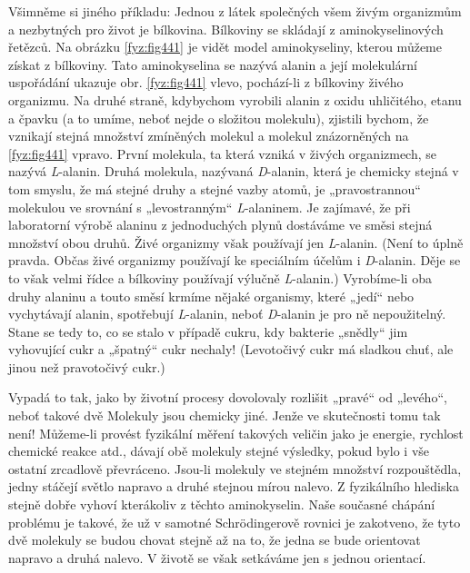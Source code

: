     Všimněme si jiného příkladu: Jednou z látek společných všem živým organizmům a nezbytných pro
    život je bílkovina. Bílkoviny se skládají z aminokyselinových řetězců. Na obrázku
    \ref{fyz:fig441} je vidět model aminokyseliny, kterou můžeme získat z bílkoviny. Tato
    aminokyselina se nazývá alanin a její molekulární uspořádání ukazuje obr. \ref{fyz:fig441}
    vlevo, pochází-li z bílkoviny živého organizmu. Na druhé straně, kdybychom vyrobili alanin z
    oxidu uhličitého, etanu a čpavku (a to umíme, neboť nejde o složitou molekulu), zjistili bychom,
    že vznikají stejná množství zmíněných molekul a molekul znázorněných na \ref{fyz:fig441}
    vpravo. První molekula, ta která vzniká v živých organizmech, se nazývá \emph{L}-alanin. Druhá
    molekula, nazývaná \emph{D}-alanin, která je chemicky stejná v tom smyslu, že má stejné druhy a
    stejné vazby atomů, je „pravostrannou“ molekulou ve srovnání s „levostranným“
    \emph{L}-alaninem. Je zajímavé, že při laboratorní výrobě alaninu z jednoduchých plynů dostáváme
    ve směsi stejná množství obou druhů. Živé organizmy však používají jen \emph{L}-alanin. (Není to
    úplně pravda. Občas živé organizmy používají ke speciálním účelům i \emph{D}-alanin. Děje se to
    však velmi řídce a bílkoviny používají výlučně \emph{L}-alanin.) Vyrobíme-li oba druhy alaninu a
    touto směsí krmíme nějaké organismy, které „jedí“ nebo vychytávají alanin, spotřebují
    \emph{L}-alanin, neboť \emph{D}-alanin je pro ně nepoužitelný. Stane se tedy to, co se stalo v
    případě cukru, kdy bakterie „snědly“ jim vyhovující cukr a „špatný“ cukr nechaly! (Levotočivý
    cukr má sladkou chuť, ale jinou než pravotočivý cukr.)

    Vypadá to tak, jako by životní procesy dovolovaly rozlišit „pravé“ od „levého“, neboť takové dvě
    Molekuly jsou chemicky jiné. Jenže ve skutečnosti tomu tak není! Můžeme-li provést fyzikální
    měření takových veličin jako je energie, rychlost chemické reakce atd., dávají obě molekuly
    stejné výsledky, pokud bylo i vše ostatní zrcadlově převráceno. Jsou-li molekuly ve stejném
    množství rozpouštědla, jedny stáčejí světlo napravo a druhé stejnou mírou nalevo. Z fyzikálního
    hlediska stejně dobře vyhoví kterákoliv z těchto aminokyselin. Naše současné chápání problému je
    takové, že už v samotné Schrödingerově rovnici je zakotveno, že tyto dvě molekuly se budou
    chovat stejně až na to, že jedna se bude orientovat napravo a druhá nalevo. V životě se však
    setkáváme jen s jednou orientací.


